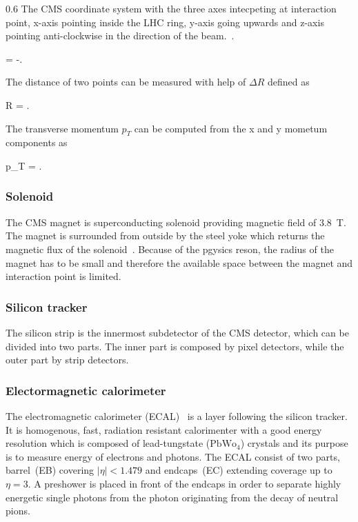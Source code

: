                  {0.6}       %
                 { The CMS coordinate system with the three axes intecpeting at interaction point, x-axis pointing inside the LHC ring, y-axis going upwards and z-axis pointing anti-clockwise in the direction of the beam.~\cite{Pantaleo:2293435}. }

{
    \eta =  -.
}

The distance of two points can be measured with help of $\Delta R$ defined as

{
    \Delta R = .
}


The transverse momentum $p_{T}$ can be computed from the x and y mometum components as

{
    p_{T} =  .
}


\subsubsection{Solenoid}


The CMS magnet is superconducting solenoid providing magnetic field of 3.8~T. The magnet is surrounded from outside by the steel yoke which returns the magnetic flux of the solenoid~\cite{tdrMagnet}. Because of the pgysics reson, the radius of the magnet has to be small and therefore the available space between the magnet and interaction point is limited.

\subsubsection{Silicon tracker}

The silicon strip is the innermost subdetector of the CMS detector, which can be divided into two parts. The inner part is composed by pixel detectors, while the outer part by strip detectors.

\subsubsection{Electormagnetic calorimeter}

The electromagnetic calorimeter (ECAL)~\cite{tdrECAL} is a layer following the silicon tracker. It is homogenous, fast, radiation resistant calorimenter with a good energy resolution which is composed of lead-tungstate ($\mathrm{PbWo_{4}}$) crystals and its purpose is to measure energy of electrons and photons. The ECAL consist of two parts, barrel~(EB) covering $|\eta|<1.479$ and endcaps~(EC) extending coverage up to $\eta =3$. A preshower is placed in front of the endcaps in order to separate highly energetic single photons from the photon originating from the decay of neutral pions.

